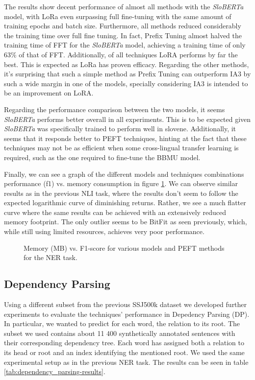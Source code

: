 \documentclass[fleqn,moreauthors,10pt]{ds_report}
\begin{document}
The results show decent performance of almost all methods with the \textit{SloBERTa} model, with LoRa even surpassing full fine-tuning with the same amount of training epochs and batch size. Furthermore, all methods reduced considerably the training time over full fine tuning. In fact, Prefix Tuning almost halved the training time of FFT for the \textit{SloBERTa} model, achieving a training time of only 63\% of that of FFT. Additionally, of all techniques LoRA performs by far the best. This is expected as LoRa has proven efficacy. Regarding the other methods, it's surprising that such a simple method as Prefix Tuning can outperform IA3 by such a wide margin in one of the models, specially considering IA3 is intended to be an improvement on LoRA. 

Regarding the performance comparison between the two models, it seems \textit{SloBERTa} performs better overall in all experiments. This is to be expected given \textit{SloBERTa} was specifically trained to perform well in slovene. Additionally, it seems that it responds better to PEFT techniques, hinting at the fact that these techniques may not be as efficient when some cross-lingual transfer learning is required, such as the one required to fine-tune the BBMU model.

Finally, we can see a graph of the different models and techniques combinations performance (f1) vs. memory consumption in figure \ref{fig:memory_vs_f1_ner}. We can observe similar results as in the previous NLI task, where the results don't seem to follow the expected logarithmic curve of diminishing returns. Rather, we see a much flatter curve where the same results can be achieved with an extensively reduced memory footprint. The only outlier seems to be BitFit as seen previously, which, while still using limited resources, achieves very poor performance.

\begin{figure}[ht]
    \centering
    
    \caption{Memory (MB) vs. F1-score for various models and PEFT methods for the NER task. }
    \label{fig:memory_vs_f1_ner}
\end{figure}



\subsection{Dependency Parsing}

Using a different subset from the previous SSJ500k dataset we developed further experiments to evaluate the techniques' performance in Depedency Parsing (DP). In particular, we wanted to predict for each word, the relation to its root. The subset we used contains about 11 400 synthetically annotated sentences with their corresponding dependency tree. Each word has assigned both a relation to its head or root and an index identifying the mentioned root. We used the same experimental setup as in the previous NER task. The results can be seen in table \ref{tab:dependency_parsing-results}.
\end{document}
